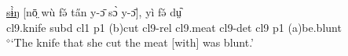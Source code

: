 \documentclass[10pt,twoside]{article}
\newcommand{\gl}[1]{`#1'}
\def\VSP{\vspace{0pt}}
\newcommand{\cl}[1]{{\sc cl#1}}
\def\elicited{$^\diamond$}
\begin{document}
\begin{exe}
%
	\ex \label{exTheKnifeThatSheCut}	
		\gll \uline{sɨ̀ŋ} [nō̤ wù fə̌ ta̋n y-ɔ̄ sɔ̀ y-ɔ̄], yì fə̌ dṳ᷆	\\
		\cl9.knife {\sc subd} \cl1  {\sc p1} ({\sc b})cut \cl9-{\sc rel} \cl9.meat \cl9-{\sc det} \cl9  {\sc p1} ({\sc a})be.blunt	\\
		\glt \VSP \elicited \gl{The knife that she cut the meat [with] was blunt.}

\end{exe}
\end{document}
